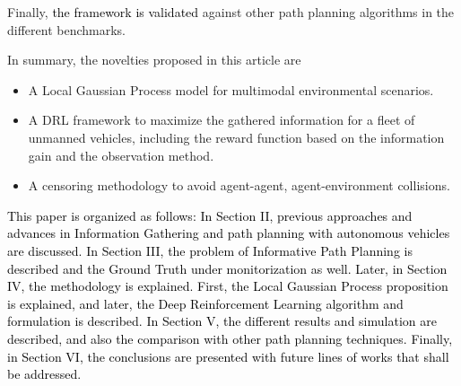 \documentclass[journal]{IEEEtran}
\newcommand\changes[1]{\textcolor{black}{#1}}
\begin{document}

Finally, \changes{the framework is validated} against other path planning algorithms in the different benchmarks. 


In summary, the novelties proposed in this article are 

\begin{itemize}
    \item A Local Gaussian Process model for multimodal environmental scenarios.
    \item A DRL framework to maximize the gathered information for a  fleet of unmanned vehicles, including the reward function based on the information gain and the observation method.
    \item A censoring methodology to avoid agent-agent, agent-environment collisions.
\end{itemize}

\changes{This paper is organized as follows: In Section II, previous approaches and advances in Information Gathering and path planning with autonomous vehicles are discussed. In Section III, the problem of Informative Path Planning is described and the Ground Truth under monitorization as well. Later, in Section IV, the methodology is explained. First, the Local Gaussian Process proposition is explained, and later, the Deep Reinforcement Learning algorithm and formulation is described. In Section V, the different results and simulation are described, and also the comparison with other path planning techniques. Finally, in Section VI, the conclusions are presented with future lines of works that shall be addressed.}
\end{document}
